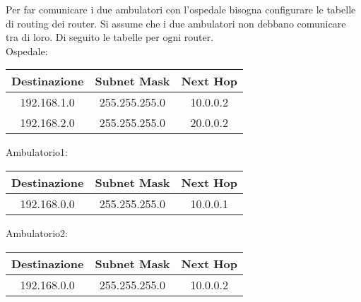 \vspace{12pt}
Per far comunicare i due ambulatori con l'ospedale bisogna configurare le tabelle di routing dei router. Si assume che
i due ambulatori non debbano comunicare tra di loro. Di seguito le tabelle per ogni router.\\
\vspace{12pt}
Ospedale:
\begin{center}
    \begin{tabular}{| c | c | c |}
        \hline
        Destinazione & Subnet Mask   & Next Hop \\ \hline
        192.168.1.0  & 255.255.255.0 & 10.0.0.2 \\ \hline
        192.168.2.0  & 255.255.255.0 & 20.0.0.2 \\ \hline
    \end{tabular}
\end{center}
\vspace*{12pt}
Ambulatorio1:
\begin{center}
    \begin{tabular}{| c | c | c |}
        \hline
        Destinazione & Subnet Mask   & Next Hop \\ \hline
        192.168.0.0  & 255.255.255.0 & 10.0.0.1 \\ \hline
    \end{tabular}
\end{center}
\vspace*{12pt}
Ambulatorio2:
\begin{center}
    \begin{tabular}{| c | c | c |}
        \hline
        Destinazione & Subnet Mask   & Next Hop \\ \hline
        192.168.0.0  & 255.255.255.0 & 10.0.0.2 \\ \hline
    \end{tabular}
\end{center}
\vspace*{12pt}
